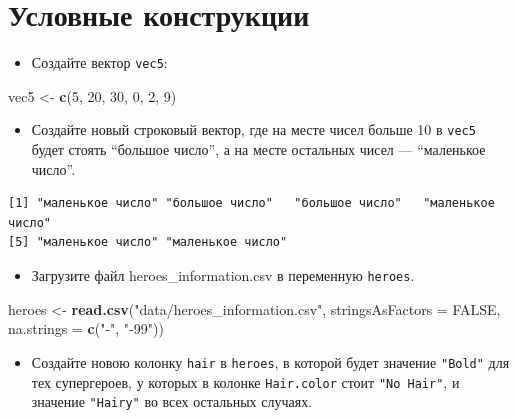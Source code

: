 \documentclass[
]{book}
\newenvironment{Shaded}{\begin{snugshade}}{\end{snugshade}}
\newcommand{\DataTypeTok}[1]{\textcolor[rgb]{0.13,0.29,0.53}{#1}}
\newcommand{\DecValTok}[1]{\textcolor[rgb]{0.00,0.00,0.81}{#1}}
\newcommand{\KeywordTok}[1]{\textcolor[rgb]{0.13,0.29,0.53}{\textbf{#1}}}
\newcommand{\NormalTok}[1]{#1}
\newcommand{\OtherTok}[1]{\textcolor[rgb]{0.56,0.35,0.01}{#1}}
\newcommand{\StringTok}[1]{\textcolor[rgb]{0.31,0.60,0.02}{#1}}
\providecommand{\tightlist}{%
  \setlength{\itemsep}{0pt}\setlength{\parskip}{0pt}}
\begin{document}
\hypertarget{task_if}{%
\section{Условные конструкции}\label{task_if}}

\begin{itemize}
\tightlist
\item
  Создайте вектор \texttt{vec5}:
\end{itemize}

\begin{Shaded}
\begin{Highlighting}[]
\NormalTok{vec5 <-}\StringTok{ }\KeywordTok{c}\NormalTok{(}\DecValTok{5}\NormalTok{, }\DecValTok{20}\NormalTok{, }\DecValTok{30}\NormalTok{, }\DecValTok{0}\NormalTok{, }\DecValTok{2}\NormalTok{, }\DecValTok{9}\NormalTok{)}
\end{Highlighting}
\end{Shaded}

\begin{itemize}
\tightlist
\item
  Создайте новый строковый вектор, где на месте чисел больше 10 в \texttt{vec5} будет стоять ``большое число'', а на месте остальных чисел --- ``маленькое число''.
\end{itemize}

\begin{verbatim}
[1] "маленькое число" "большое число"   "большое число"   "маленькое число"
[5] "маленькое число" "маленькое число"
\end{verbatim}

\begin{itemize}
\tightlist
\item
  Загрузите файл heroes\_information.csv в переменную \texttt{heroes}.
\end{itemize}

\begin{Shaded}
\begin{Highlighting}[]
\NormalTok{heroes <-}\StringTok{ }\KeywordTok{read.csv}\NormalTok{(}\StringTok{"data/heroes_information.csv"}\NormalTok{, }
                   \DataTypeTok{stringsAsFactors =} \OtherTok{FALSE}\NormalTok{,}
                   \DataTypeTok{na.strings =} \KeywordTok{c}\NormalTok{(}\StringTok{"-"}\NormalTok{, }\StringTok{"-99"}\NormalTok{))}
\end{Highlighting}
\end{Shaded}

\begin{itemize}
\tightlist
\item
  Создайте новою колонку \texttt{hair} в \texttt{heroes}, в которой будет значение \texttt{"Bold"} для тех супергероев, у которых в колонке \texttt{Hair.color} стоит \texttt{"No\ Hair"}, и значение \texttt{"Hairy"} во всех остальных случаях.
\end{itemize}
\end{document}
